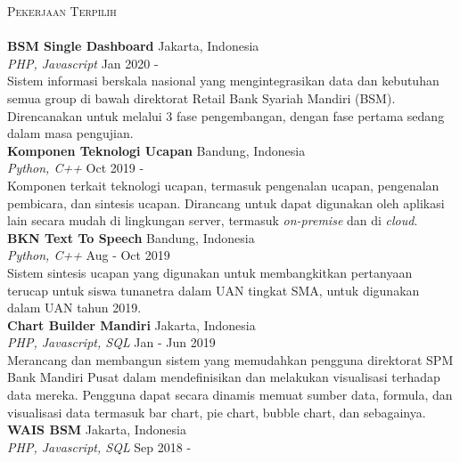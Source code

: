 \documentclass[a4paper]{article}
\newcommand{\lineunder} {
    \vspace*{-8pt} \\
    \hspace*{-18pt} \hrulefill \\
}
\newcommand{\header} [1] {
    {\hspace*{-18pt}\vspace*{6pt} \textsc{#1}}
    \vspace*{-6pt} \lineunder
}
\begin{document}
\header{Pekerjaan Terpilih}
\vspace{2mm}
{\textbf{BSM Single Dashboard}} \hfill Jakarta, Indonesia \\
{\sl PHP, Javascript} \hfill Jan 2020 - \\
\vspace{1mm}
Sistem informasi berskala nasional yang mengintegrasikan data dan kebutuhan
semua group di bawah direktorat Retail Bank Syariah Mandiri (BSM). Direncanakan
untuk melalui 3 fase pengembangan, dengan fase pertama sedang dalam masa
pengujian.\\
\vspace*{3mm}
{\textbf{Komponen Teknologi Ucapan}} \hfill Bandung, Indonesia \\
{\sl Python, C++} \hfill Oct 2019 - \\
\vspace{1mm}
Komponen terkait teknologi ucapan, termasuk pengenalan ucapan, pengenalan
pembicara, dan sintesis ucapan. Dirancang untuk dapat digunakan oleh aplikasi
lain secara mudah di lingkungan server, termasuk \textit{on-premise} dan di
\textit{cloud}. \\
\vspace*{3mm}
{\textbf{BKN Text To Speech}} \hfill Bandung, Indonesia \\
{\sl Python, C++} \hfill Aug - Oct 2019 \\
\vspace*{1mm}
Sistem sintesis ucapan yang digunakan untuk membangkitkan pertanyaan terucap
untuk siswa tunanetra dalam UAN tingkat SMA, untuk digunakan dalam UAN tahun
2019.\\
\vspace*{3mm}
{\textbf{Chart Builder Mandiri}} \hfill Jakarta, Indonesia \\
{\sl PHP, Javascript, SQL} \hfill Jan - Jun 2019 \\
\vspace*{1mm}
Merancang dan membangun sistem yang memudahkan pengguna direktorat SPM Bank
Mandiri Pusat dalam mendefinisikan dan melakukan visualisasi terhadap data
mereka. Pengguna dapat secara dinamis memuat sumber data, formula, dan
visualisasi data termasuk bar chart, pie chart, bubble chart, dan sebagainya.\\
\vspace*{3mm}
{\textbf{WAIS BSM}} \hfill Jakarta, Indonesia \\
{\sl PHP, Javascript, SQL} \hfill Sep 2018 - \\
\vspace*{1mm}
\end{document}
